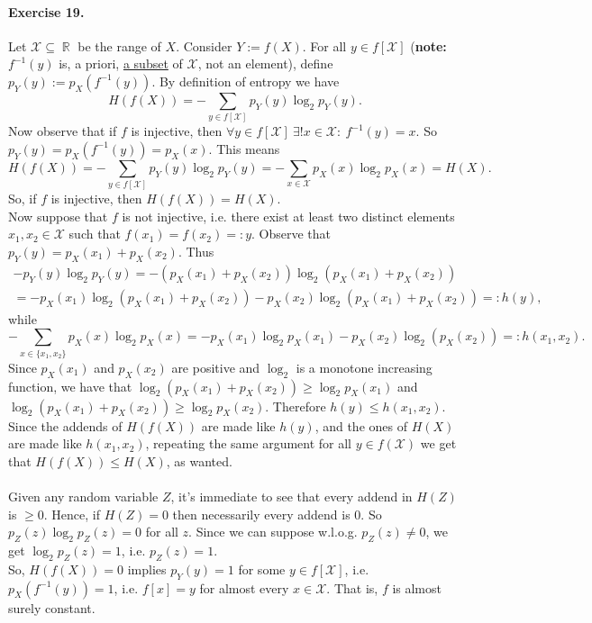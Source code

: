 \documentclass[12pt,a4paper]{report}
\theoremstyle{definition}
\theoremstyle{num.custom-title}
\DeclareMathOperator{\R}{\mathbb{R}}
\DeclareMathOperator{\sse}{\subseteq}
\newcommand{\X}{\mathbf{X}}
\renewcommand{\1}{\mathbbm{1}}
\begin{document}
\paragraph{Exercise 19.}
\renewcommand{\X}{\mathcal{X}}
Let $\X \sse \R$ be the range of $X$. Consider $Y := f(X)$. For all $y \in f[\X]$ (\textbf{note:} $f^{-1}(y)$ is, a priori, \underline{a subset} of $\X$, not an element), define $p_Y(y) := p_X(f^{-1}(y))$. By definition of entropy we have
\[
H(f(X)) = -\sum_{y \in f[\X]} p_Y(y) \log_2 p_Y(y).
\]
Now observe that if $f$ is injective, then $\forall y \in f[\X] \ \exists! x \in \X : \ f^{-1}(y)=x$. So $p_Y(y)=p_X(f^{-1}(y))=p_X(x)$. This means
\[
H(f(X)) = -\sum_{y \in f[\mathcal{X}]} p_Y(y) \log_2 p_Y(y) = -\sum_{x \in \X} p_X(x) \log_2 p_X(x) = H(X).
\]
So, if $f$ is injective, then $H(f(X))=H(X)$.\\
Now suppose that $f$ is not injective, i.e. there exist at least two distinct elements $x_1,x_2 \in \X$ such that $f(x_1)=f(x_2) =: y$. Observe that $p_Y(y) = p_X(x_1)+p_X(x_2)$. Thus
\begin{multline*}
- p_Y(y) \log_2 p_Y(y) = - (p_X(x_1)+p_X(x_2)) \log_2 (p_X(x_1)+p_X(x_2))\\
= - p_X(x_1) \log_2 (p_X(x_1)+p_X(x_2)) - p_X(x_2) \log_2 (p_X(x_1)+p_X(x_2)) =: h(y),
\end{multline*}
while
\[
-\sum_{x \in \{x_1,x_2\}} p_X(x) \log_2 p_X(x) = - p_X(x_1) \log_2 p_X(x_1) - p_X(x_2) \log_2 (p_X(x_2)) =: h(x_1,x_2).
\]
Since $p_X(x_1)$ and $p_X(x_2)$ are positive and $\log_2$ is a monotone increasing function, we have that $\log_2 (p_X(x_1)+p_X(x_2)) \geq \log_2 p_X(x_1)$ and $\log_2 (p_X(x_1)+p_X(x_2)) \geq \log_2 p_X(x_2)$. Therefore $h(y) \leq h(x_1,x_2)$.\\
Since the addends of $H(f(X))$ are made like $h(y)$, and the ones of $H(X)$ are made like $h(x_1,x_2)$, repeating the same argument for all $y \in f(\X)$ we get that $H(f(X)) \leq H(X)$, as wanted.\\
\\
Given any random variable $Z$, it's immediate to see that every addend in $H(Z)$ is $\geq 0$. Hence, if $H(Z)=0$ then necessarily every addend is $0$. So $p_Z(z) \log_2 p_Z(z) = 0$ for all $z$. Since we can suppose w.l.o.g. $p_Z(z) \neq 0$, we get $\log_2 p_Z(z) = 1$, i.e. $p_Z(z)=1$.\\
So, $H(f(X))=0$ implies $p_Y(y)=1$ for some $y \in f[\mathcal{X}]$, i.e. $p_X(f^{-1}(y))=1$, i.e. $f[x]=y$ for almost every $x \in \X$. That is, $f$ is almost surely constant.
\end{document}
